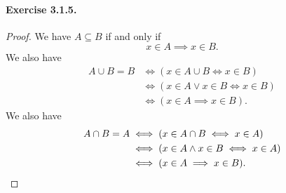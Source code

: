 \paragraph{Exercise 3.1.5.}
\begin{proof}
    We have $A\subseteq B$ if and only if \[x\in A \implies x\in B.\] We also have 
    \begin{align*}
        A \cup B = B &\iff (x\in A \cup B \iff x \in B) \\
        &\iff (x\in A \lor x\in B \iff x \in B) \\
        &\iff (x\in A \implies x\in B).
    \end{align*}
    We also have 
    \begin{align*}
        A \cap B = A &\iff (x\in A \cap B \iff x \in A) \\
        &\iff (x\in A \land x\in B \iff x \in A) \\
        &\iff (x\in A \implies x\in B).\qedhere
    \end{align*}
\end{proof}


